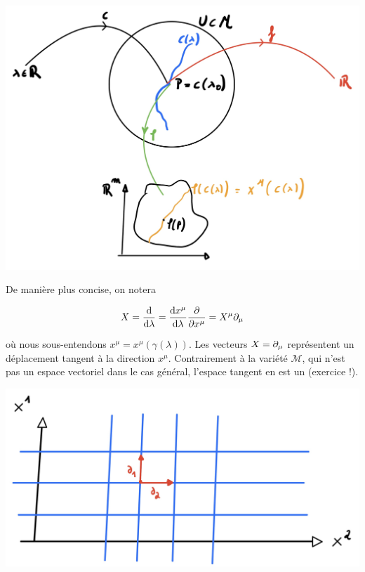 \begin{center}
\includegraphics[scale=0.1]{Chapitres/3.Element de géométrie différentielle/Images/dimenson.jpg}
\end{center}


De manière plus concise, on notera

\begin{equation*}
    X = \frac{\mathrm{d}}{\mathrm{d} \lambda }= \frac{\mathrm{d} x^{\mu}}{\mathrm{d} \lambda } \frac{\partial }{\partial x^{\mu}} = X^{\mu} \partial_{\mu}
\end{equation*}

où nous sous-entendons $x^{\mu} = x^{\mu}( \gamma(\lambda))$. Les vecteurs $X = \partial_\mu$ représentent un déplacement tangent à la direction $x^\mu$. Contrairement à la variété $\mathcal{M}$, qui n'est pas un espace vectoriel dans le cas général, l'espace tangent en est un (exercice !). 
\begin{center}
\includegraphics[scale=0.1]{Chapitres/3.Element de géométrie différentielle/Images/vecteur-fleche.jpg}
\end{center}
\cutebreak
